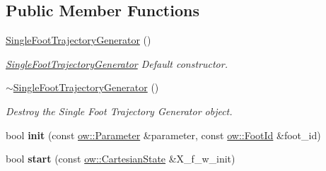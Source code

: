 \subsection*{Public Member Functions}
\begin{DoxyCompactItemize}
\item 
\hyperlink{classow__ftg_1_1SingleFootTrajectoryGenerator_a97e7d2f33c173bec458c7f7abc535a13}{Single\+Foot\+Trajectory\+Generator} ()\hypertarget{classow__ftg_1_1SingleFootTrajectoryGenerator_a97e7d2f33c173bec458c7f7abc535a13}{}\label{classow__ftg_1_1SingleFootTrajectoryGenerator_a97e7d2f33c173bec458c7f7abc535a13}

\begin{DoxyCompactList}\small\item\em \hyperlink{classow__ftg_1_1SingleFootTrajectoryGenerator}{Single\+Foot\+Trajectory\+Generator} Default constructor. \end{DoxyCompactList}\item 
\hyperlink{classow__ftg_1_1SingleFootTrajectoryGenerator_a39303c2356811311b925b1f80a3e7ae3}{$\sim$\+Single\+Foot\+Trajectory\+Generator} ()\hypertarget{classow__ftg_1_1SingleFootTrajectoryGenerator_a39303c2356811311b925b1f80a3e7ae3}{}\label{classow__ftg_1_1SingleFootTrajectoryGenerator_a39303c2356811311b925b1f80a3e7ae3}

\begin{DoxyCompactList}\small\item\em Destroy the Single Foot Trajectory Generator object. \end{DoxyCompactList}\item 
bool {\bfseries init} (const \hyperlink{classow_1_1Parameter}{ow\+::\+Parameter} \&parameter, const \hyperlink{foot__id_8h_a57e66d30579b22cfe2c17c739278e5a6}{ow\+::\+Foot\+Id} \&foot\+\_\+id)\hypertarget{classow__ftg_1_1SingleFootTrajectoryGenerator_a62ae89fc7c7062611a7232bbc164bbc2}{}\label{classow__ftg_1_1SingleFootTrajectoryGenerator_a62ae89fc7c7062611a7232bbc164bbc2}

\item 
bool {\bfseries start} (const \hyperlink{classow__core_1_1CartesianState}{ow\+::\+Cartesian\+State} \&X\+\_\+f\+\_\+w\+\_\+init)\hypertarget{classow__ftg_1_1SingleFootTrajectoryGenerator_a7271445fcb40f08338524c944edaadf3}{}\label{classow__ftg_1_1SingleFootTrajectoryGenerator_a7271445fcb40f08338524c944edaadf3}


\end{DoxyCompactItemize}
